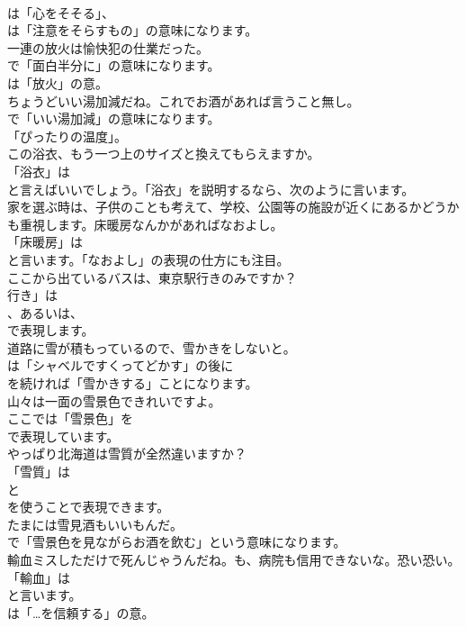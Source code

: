 \documentclass[8pt]{extreport}
\begin{document}
\begin{CJK}{UTF8}{min}
\\	は「心をそそる」、
\\	は「注意をそらすもの」の意味になります。	
\\	一連の放火は愉快犯の仕業だった。 
\\	で「面白半分に」の意味になります。
\\	は「放火」の意。	
\\	ちょうどいい湯加減だね。これでお酒があれば言うこと無し。 
\\	で「いい湯加減」の意味になります。
\\	「ぴったりの温度」。	
\\	この浴衣、もう一つ上のサイズと換えてもらえますか。 
\\	「浴衣」は
\\	と言えばいいでしょう。「浴衣」を説明するなら、次のように言います。
\\	家を選ぶ時は、子供のことも考えて、学校、公園等の施設が近くにあるかどうかも重視します。床暖房なんかがあればなおよし。 
\\	「床暖房」は
\\	と言います。「なおよし」の表現の仕方にも注目。	
\\	ここから出ているバスは、東京駅行きのみですか？ 
\\	行き」は
\\	、あるいは、
\\	で表現します。	
\\	道路に雪が積もっているので、雪かきをしないと。 
\\	は「シャベルですくってどかす」の後に
\\	を続ければ「雪かきする」ことになります。	
\\	山々は一面の雪景色できれいですよ。 
\\	ここでは「雪景色」を
\\	で表現しています。	
\\	やっぱり北海道は雪質が全然違いますか？ 
\\	「雪質」は
\\	と
\\	を使うことで表現できます。	
\\	たまには雪見酒もいいもんだ。 
\\	で「雪景色を見ながらお酒を飲む」という意味になります。	
\\	輸血ミスしただけで死んじゃうんだね。も、病院も信用できないな。恐い恐い。 
\\	「輸血」は 
\\	と言います。
\\	は「…を信頼する」の意。	

\end{CJK}
\end{document}
